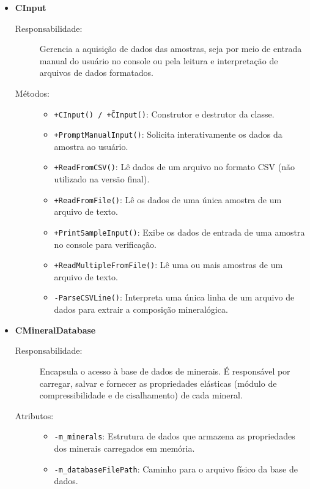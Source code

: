 \begin{itemize}
    \item \textbf{CInput}
    \begin{description}
        \item[Responsabilidade:] Gerencia a aquisição de dados das amostras, seja por meio de entrada manual do usuário no console ou pela leitura e interpretação de arquivos de dados formatados.
        
        \item[Métodos:]
        \begin{itemize}
            \item \texttt{+CInput() / +\~CInput()}: Construtor e destrutor da classe.
            \item \texttt{+PromptManualInput()}: Solicita interativamente os dados da amostra ao usuário.
            \item \texttt{+ReadFromCSV()}: Lê dados de um arquivo no formato CSV (não utilizado na versão final).
            \item \texttt{+ReadFromFile()}: Lê os dados de uma única amostra de um arquivo de texto.
            \item \texttt{+PrintSampleInput()}: Exibe os dados de entrada de uma amostra no console para verificação.
            \item \texttt{+ReadMultipleFromFile()}: Lê uma ou mais amostras de um arquivo de texto.
            \item \texttt{-ParseCSVLine()}: Interpreta uma única linha de um arquivo de dados para extrair a composição mineralógica.
        \end{itemize}
    \end{description}

    \item \textbf{CMineralDatabase}
    \begin{description}
        \item[Responsabilidade:] Encapsula o acesso à base de dados de minerais. É responsável por carregar, salvar e fornecer as propriedades elásticas (módulo de compressibilidade e de cisalhamento) de cada mineral.
        
        \item[Atributos:]
        \begin{itemize}
            \item \texttt{-m\_minerals}: Estrutura de dados que armazena as propriedades dos minerais carregados em memória.
            \item \texttt{-m\_databaseFilePath}: Caminho para o arquivo físico da base de dados.
        \end{itemize}
        

\end{description}
\end{itemize}
